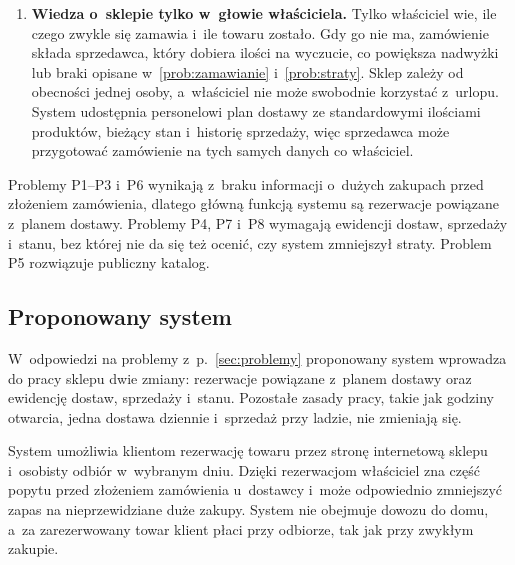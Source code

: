 \documentclass[12pt,a4paper,oneside]{article}
\newcounter{pu}
\begin{document}
\begin{enumerate}[label=\textbf{P\arabic*.},ref=P\arabic*,leftmargin=1.2cm]
	\item \label{prob:wiedza}
	\textbf{Wiedza o~sklepie tylko w~głowie właściciela.} Tylko właściciel wie, ile czego zwykle się zamawia i~ile towaru zostało. Gdy go nie ma, zamówienie składa sprzedawca, który dobiera ilości na wyczucie, co powiększa nadwyżki lub braki opisane w~\ref{prob:zamawianie} i~\ref{prob:straty}. Sklep zależy od obecności jednej osoby, a~właściciel nie może swobodnie korzystać z~urlopu. System udostępnia personelowi plan dostawy ze standardowymi ilościami produktów, bieżący stan i~historię sprzedaży, więc sprzedawca może przygotować zamówienie na tych samych danych co właściciel.
\end{enumerate}

Problemy P1--P3 i~P6 wynikają z~braku informacji o~dużych zakupach przed złożeniem zamówienia, dlatego główną funkcją systemu są rezerwacje powiązane z~planem dostawy. Problemy P4, P7 i~P8 wymagają ewidencji dostaw, sprzedaży i~stanu, bez której nie da się też ocenić, czy system zmniejszył straty. Problem P5 rozwiązuje publiczny katalog.

\subsection{Proponowany system}
\label{sec:system}

W~odpowiedzi na problemy z~p.~\ref{sec:problemy} proponowany system wprowadza do pracy sklepu dwie zmiany: rezerwacje powiązane z~planem dostawy oraz ewidencję dostaw, sprzedaży i~stanu. Pozostałe zasady pracy, takie jak godziny otwarcia, jedna dostawa dziennie i~sprzedaż przy ladzie, nie zmieniają się.

System umożliwia klientom rezerwację towaru przez stronę internetową sklepu i~osobisty odbiór w~wybranym dniu. Dzięki rezerwacjom właściciel zna część popytu przed złożeniem zamówienia u~dostawcy i~może odpowiednio zmniejszyć zapas na nieprzewidziane duże zakupy. System nie obejmuje dowozu do domu, a~za zarezerwowany towar klient płaci przy odbiorze, tak jak przy zwykłym zakupie.
\end{document}
